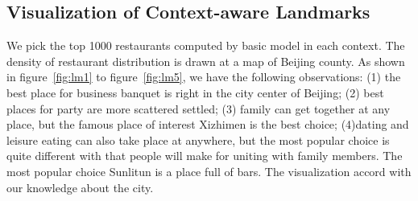 \documentclass[preprint,12pt]{elsarticle}
\begin{document}
\subsection{Visualization of Context-aware Landmarks}
We pick the top 1000 restaurants computed by basic model in each context. The density of restaurant distribution is drawn at a map of Beijing county. As shown in figure~\ref{fig:lm1} to figure~\ref{fig:lm5}, we have the following observations: (1) the best place for business banquet is right in the city center of Beijing; (2) best places for party are more scattered settled; (3) family can get together at any place, but the famous place of interest Xizhimen is the best choice; (4)dating and leisure eating can also take place at anywhere, but the most popular choice is quite different with that people will make for uniting with family members. The most popular choice Sunlitun is a place full of bars. The visualization accord with our knowledge about the city.
\end{document}
